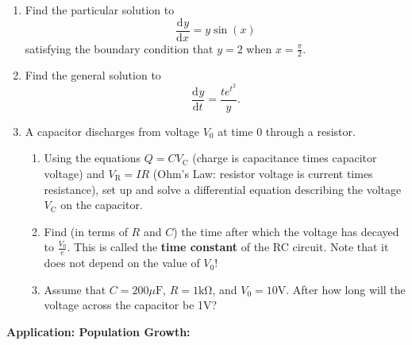 \documentclass{article}
\newcommand{\deriv}[3][]{\frac{\mathrm{d}^{#1}#2}{\mathrm{d}#3^{#1}}}
\begin{document}
\begin{enumerate}
	\item Find the particular solution to
		\[\deriv{y}{x}=y\sin(x)\]
		satisfying the boundary condition that $y=2$ when $x=\frac{\pi}{2}$.
	\item Find the general solution to
		\[\deriv{y}{t}=\frac{t e^{t^2}}{y}.\]
	\item A capacitor discharges from voltage $V_0$ at time 0 through a resistor.
		\begin{enumerate}
			\item Using the equations $Q=CV_\mathrm{C}$ (charge is capacitance times capacitor voltage) and $V_\mathrm{R}=IR$ (Ohm's Law: resistor voltage is current times resistance), set up and solve a differential equation describing the voltage $V_\mathrm{C}$ on the capacitor.
			\item Find (in terms of $R$ and $C$) the time after which the voltage has decayed to $\frac{V_0}{e}$. This is called the \textbf{time constant} of the RC circuit. Note that it does not depend on the value of $V_0$!
			\item Assume that $C=200\mu\mathrm{F}$, $R=1\mathrm{k\Omega}$, and $V_0=10\mathrm{V}$. After how long will the voltage across the capacitor be 1V?
		\end{enumerate}
\end{enumerate}











\clearpage





\textbf{Application: Population Growth:}\bigskip
\end{document}
